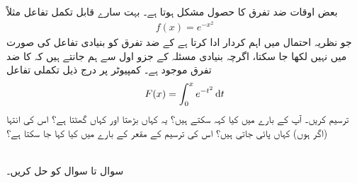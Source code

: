 بعض اوقات ضد تفرق کا حصول مشکل ہوتا ہے۔ بہت سارے قابل تکمل تفاعل مثلاً
\begin{align*}
f(x)=e^{-x^2}
\end{align*}
جو  نظریہ احتمال میں اہم کردار ادا کرتا ہے کے ضد تفرق کو بنیادی تفاعل کی صورت میں نہیں لکھا جا سکتا، اگرچہ بنیادی مسئلہ کے جزو اول سے ہم جانتے ہیں کہ  کا ضد تفرق موجود ہے۔ کمپیوٹر پر درج ذیل تکملی تفاعل
\begin{align*}
F(x)=\int_0^xe^{-t^2}\dif t
\end{align*}
ترسیم کریں۔ آپ  کے بارے میں کیا کہہ سکتے ہیں؟ یہ کہاں بڑھتا اور کہاں گھٹتا ہے؟ اس کی  انتہا (اگر ہوں) کہاں پائی جاتی  ہیں؟ اس کی ترسیم کے مقعر کے بارے میں کیا کہا جا سکتا ہے؟



\\
سوال  تا سوال  کو حل کریں۔

